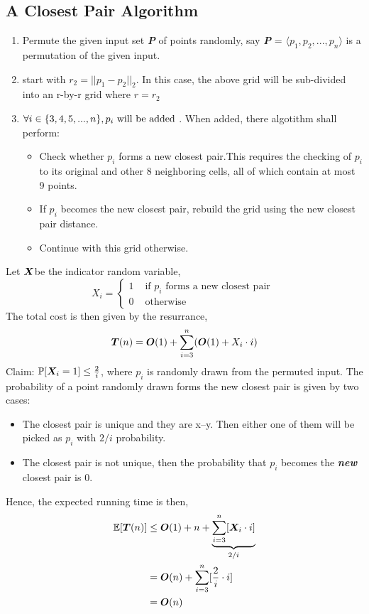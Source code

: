 \documentclass[12pt]{article}
\begin{document}
 \subsection{A Closest Pair Algorithm}
 \begin{enumerate}
     \item Permute the given input set \textbf{\textit{P}} of points randomly, say  \textbf{\textit{P}} =  $\langle p_{1},p_{2},...,p_{n}\rangle $ is a permutation of the given input.
     \item start with $r_{2} = || p_{1} - p_{2} ||_{2}$. In this case, the above grid will be sub-divided into an  r-by-r grid where $r=r_{2}$
     \item $ \forall i \in \{3,4,5, ... , n\}, p_{i} \textmd{ will be added} $ . When added, there algotithm shall perform:
     \begin{itemize}
         \item Check whether $p_{i}$ forms a new closest pair.This requires the checking of $p_{i}$ to its original and other 8 neighboring cells, all of which contain at most 9 points. 
         \item If $p_{i}$ becomes the new closest pair, rebuild the grid using the new closest pair distance.
         \item Continue with this grid otherwise.
     \end{itemize}
 \end{enumerate}
 
Let ${\boldsymbol X} $be the indicator random variable, 
$$X_{i} =\begin{cases}
                   1 &\text{ if $p_{i}$ forms a new closest pair }\\
                   0 &\text{ otherwise}
               \end{cases}
               $$
The total cost is then given by the resurrance,
$${\boldsymbol T}(n) = {\boldsymbol O}(1) + \sum_{i=3}^n ({\boldsymbol O}(1) + X_{i}\cdot i)$$
Claim: $\mathbb{P}[{\boldsymbol X}_{i}=1] \leq \frac{2}{i}$, where $p_i$ is randomly drawn from the permuted input. The probability of a point randomly drawn forms the new closest pair is given by two cases:
\begin{itemize}
    \item The closest pair is unique and they are x--y. Then either one of them will be picked as $p_{i}$ with $2/i$ probability. 
    \item The closest pair is not unique, then the probability that $p_{i}$ becomes the \textbf{\textit{new}} closest pair is 0.  
\end{itemize}
Hence, the expected running time is then,
\begin{align*}
  \mathbb{E}[{\boldsymbol T}(n)] &\leq   {\boldsymbol O}(1) + n + \underbrace{\sum_{i=3}^n[{\boldsymbol X}_{i}\cdot i]}_{2/i}\\
                    & = {\boldsymbol O}(n) + \sum_{i=3}^n[\frac{2}{i}\cdot i]\\
                    &= {\boldsymbol O}(n)
\end{align*}

                    
\end{document}
